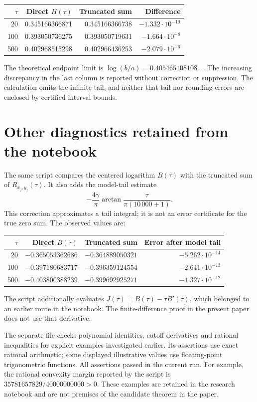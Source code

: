 \documentclass[11pt,a4paper]{article}
\begin{document}
\begin{center}
\begin{tabular}{rrrr}
\toprule
$\tau$ & Direct $H(\tau)$ & Truncated sum & Difference\\
\midrule
20  & 0.345166366871 & 0.345166366738 & $-1.332\cdot10^{-10}$\\
100 & 0.393050736275 & 0.393050719631 & $-1.664\cdot10^{-8}$\\
500 & 0.402968515298 & 0.402966436253 & $-2.079\cdot10^{-6}$\\
\bottomrule
\end{tabular}
\end{center}
The theoretical endpoint limit is
$\log(b/a)=0.405465108108\ldots$.
The increasing discrepancy in the last column is reported without
correction or suppression. The calculation omits the infinite tail,
and neither that tail nor rounding errors are enclosed by certified
interval bounds.

\section{Other diagnostics retained from the notebook}
The same script compares the centered logarithm $B(\tau)$ with the
truncated sum of $R_{x_j,y_j}(\tau)$. It also adds the model-tail estimate
\[
 -\frac{4\gamma}{\pi}
   \arctan\frac{\tau}{\pi(10\,000+1)} .
\]
This correction approximates a tail integral; it is not an error
certificate for the true zero sum. The observed values are:
\begin{center}
\begin{tabular}{rrrr}
\toprule
$\tau$ & Direct $B(\tau)$ & Truncated sum & Error after model tail\\
\midrule
20  & $-0.365053362686$ & $-0.364889050321$ & $-5.262\cdot10^{-14}$\\
100 & $-0.397180683717$ & $-0.396359124554$ & $-2.641\cdot10^{-13}$\\
500 & $-0.403800388239$ & $-0.399692925271$ & $-1.327\cdot10^{-12}$\\
\bottomrule
\end{tabular}
\end{center}
The script additionally evaluates $J(\tau)=B(\tau)-\tau B'(\tau)$,
which belonged to an earlier route in the notebook.
The finite-difference proof in the present paper does not use that derivative.

The separate file  checks polynomial
identities, cutoff derivatives and rational inequalities for explicit
examples investigated earlier. Its assertions use exact rational
arithmetic; some displayed illustrative values use floating-point
trigonometric functions. All assertions passed in the current run.
For example, the rational convexity margin reported by the script is
$35781657829/40000000000>0$.
These examples are retained in the research notebook and are not premises
of the candidate theorem in the paper.
\end{document}
